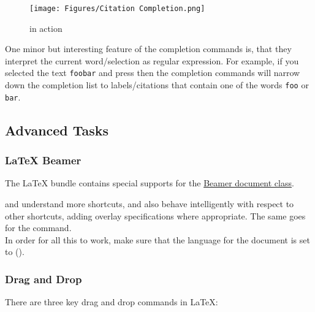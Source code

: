 \documentclass[11pt, x11names]{article}
\begin{document}
\begin{figure}[h]
  \centering
    \texttt{[image: Figures/Citation Completion.png]}
  \caption{ in action}
  \label{fig:Figures_Citation_Completion}
\end{figure}

One minor but interesting feature of the completion commands is, that they interpret the current word/selection as regular expression. For example, if you selected the text \texttt{foo\textbar{}bar} and press \keys{\Alt + \esc} then the completion commands will narrow down the completion list to labels/citations that contain one of the words \texttt{foo} or \texttt{bar}.

\subsection{Advanced Tasks}

\subsubsection{LaTeX Beamer}

The LaTeX bundle contains special supports for the \href{https://bitbucket.org/rivanvx/beamer/wiki/Home}{Beamer document class}.

 and  understand more shortcuts, and also behave intelligently with respect to other shortcuts, adding overlay specifications where appropriate. The same goes for the  command.\\

In order for all this to work, make sure that the language for the document is set to  ().

\subsubsection{Drag and Drop}

There are three key drag and drop commands in LaTeX:
\end{document}
